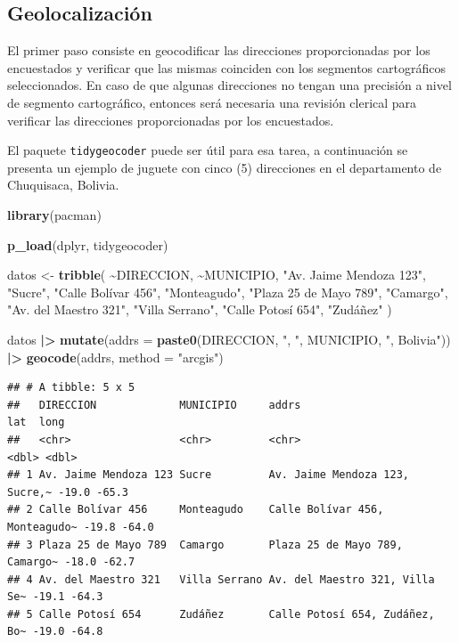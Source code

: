\documentclass[
  12pt,
]{book}
\newenvironment{Shaded}{\begin{snugshade}}{\end{snugshade}}
\newcommand{\AttributeTok}[1]{\textcolor[rgb]{0.13,0.29,0.53}{#1}}
\newcommand{\FunctionTok}[1]{\textcolor[rgb]{0.13,0.29,0.53}{\textbf{#1}}}
\newcommand{\NormalTok}[1]{#1}
\newcommand{\OtherTok}[1]{\textcolor[rgb]{0.56,0.35,0.01}{#1}}
\newcommand{\SpecialCharTok}[1]{\textcolor[rgb]{0.81,0.36,0.00}{\textbf{#1}}}
\newcommand{\StringTok}[1]{\textcolor[rgb]{0.31,0.60,0.02}{#1}}
\begin{document}
\subsection{Geolocalización}\label{geolocalizaciuxf3n}

El primer paso consiste en geocodificar las direcciones proporcionadas por los encuestados y verificar que las mismas coinciden con los segmentos cartográficos seleccionados. En caso de que algunas direcciones no tengan una precisión a nivel de segmento cartográfico, entonces será necesaria una revisión clerical para verificar las direcciones proporcionadas por los encuestados.

El paquete \texttt{tidygeocoder} \citep{tidygeocoder} puede ser útil para esa tarea, a continuación se presenta un ejemplo de juguete con cinco (5) direcciones en el departamento de Chuquisaca, Bolivia.

\begin{Shaded}
\begin{Highlighting}[]
\FunctionTok{library}\NormalTok{(pacman)}

\FunctionTok{p\_load}\NormalTok{(dplyr, tidygeocoder)}

\NormalTok{datos }\OtherTok{\textless{}{-}} \FunctionTok{tribble}\NormalTok{(}
  \SpecialCharTok{\textasciitilde{}}\NormalTok{DIRECCION, }\SpecialCharTok{\textasciitilde{}}\NormalTok{MUNICIPIO,}
  \StringTok{"Av. Jaime Mendoza 123"}\NormalTok{, }\StringTok{"Sucre"}\NormalTok{,}
  \StringTok{"Calle Bolívar 456"}\NormalTok{, }\StringTok{"Monteagudo"}\NormalTok{,}
  \StringTok{"Plaza 25 de Mayo 789"}\NormalTok{, }\StringTok{"Camargo"}\NormalTok{,}
  \StringTok{"Av. del Maestro 321"}\NormalTok{, }\StringTok{"Villa Serrano"}\NormalTok{,}
  \StringTok{"Calle Potosí 654"}\NormalTok{, }\StringTok{"Zudáñez"}
\NormalTok{)}

\NormalTok{datos }\SpecialCharTok{|\textgreater{}}
  \FunctionTok{mutate}\NormalTok{(}\AttributeTok{addrs =} \FunctionTok{paste0}\NormalTok{(DIRECCION, }\StringTok{", "}\NormalTok{, MUNICIPIO, }\StringTok{", Bolivia"}\NormalTok{)) }\SpecialCharTok{|\textgreater{}}
  \FunctionTok{geocode}\NormalTok{(addrs, }\AttributeTok{method =} \StringTok{"arcgis"}\NormalTok{)}
\end{Highlighting}
\end{Shaded}

\begin{verbatim}
## # A tibble: 5 x 5
##   DIRECCION             MUNICIPIO     addrs                            lat  long
##   <chr>                 <chr>         <chr>                          <dbl> <dbl>
## 1 Av. Jaime Mendoza 123 Sucre         Av. Jaime Mendoza 123, Sucre,~ -19.0 -65.3
## 2 Calle Bolívar 456     Monteagudo    Calle Bolívar 456, Monteagudo~ -19.8 -64.0
## 3 Plaza 25 de Mayo 789  Camargo       Plaza 25 de Mayo 789, Camargo~ -18.0 -62.7
## 4 Av. del Maestro 321   Villa Serrano Av. del Maestro 321, Villa Se~ -19.1 -64.3
## 5 Calle Potosí 654      Zudáñez       Calle Potosí 654, Zudáñez, Bo~ -19.0 -64.8
\end{verbatim}
\end{document}
